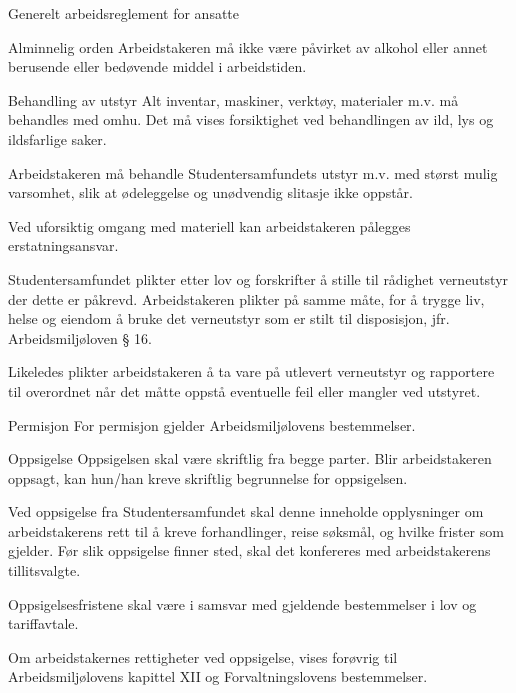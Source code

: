 \documentclass[fsbok.tex]{subfiles}
\begin{document}
\begin{lovkapittel}{Generelt arbeidsreglement for ansatte}
\begin{lovparagraf}{Alminnelig orden}
        Arbeidstakeren må ikke være påvirket av alkohol eller annet berusende eller bedøvende middel i arbeidstiden.
    \end{lovparagraf}

    \begin{lovparagraf}{Behandling av utstyr}
        Alt inventar, maskiner, verktøy, materialer m.v. må behandles med omhu. Det må vises forsiktighet ved behandlingen
        av ild, lys og ildsfarlige saker.

        Arbeidstakeren må behandle Studentersamfundets utstyr m.v. med størst mulig varsomhet, slik at ødeleggelse og
        unødvendig slitasje ikke oppstår.

        Ved uforsiktig omgang med materiell kan arbeidstakeren pålegges erstatningsansvar.

        Studentersamfundet plikter etter lov og forskrifter å stille til rådighet verneutstyr der dette er påkrevd. Arbeidstakeren
        plikter på samme måte, for å trygge liv, helse og eiendom å bruke det verneutstyr som er stilt til disposisjon, jfr.
        Arbeidsmiljøloven § 16.

        Likeledes plikter arbeidstakeren å ta vare på utlevert verneutstyr og rapportere til overordnet når det måtte oppstå
        eventuelle feil eller mangler ved utstyret.
    \end{lovparagraf}

    \begin{lovparagraf}{Permisjon}
        For permisjon gjelder Arbeidsmiljølovens bestemmelser.
    \end{lovparagraf}

    \begin{lovparagraf}{Oppsigelse}
        Oppsigelsen skal være skriftlig fra begge parter. Blir arbeidstakeren oppsagt, kan hun/han kreve skriftlig begrunnelse
        for oppsigelsen.

        Ved oppsigelse fra Studentersamfundet skal denne inneholde opplysninger om arbeidstakerens rett til å kreve
        forhandlinger, reise søksmål, og hvilke frister som gjelder. Før slik oppsigelse finner sted, skal det konfereres med
        arbeidstakerens tillitsvalgte.

        Oppsigelsesfristene skal være i samsvar med gjeldende bestemmelser i lov og tariffavtale.

        Om arbeidstakernes rettigheter ved oppsigelse, vises forøvrig til Arbeidsmiljølovens kapittel XII og
        Forvaltningslovens bestemmelser.


\end{lovparagraf}
\end{lovkapittel}
\end{document}
